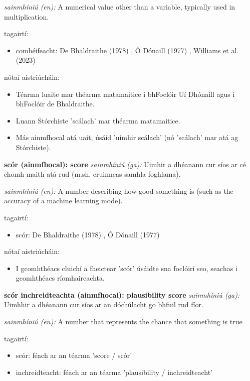 \documentclass{article}
\begin{document}
\textit{sainmhíniú (en):} A numerical value other than a variable, typically used in multiplication.

tagairtí:
\begin{itemize}
	\item comhéifeacht: De Bhaldraithe (1978) \cite{de-bhaldraithe}, Ó Dónaill (1977) \cite{odonaill}, Williams et al. (2023) \cite{storchiste}
\end{itemize}

nótaí aistriúcháin:
\begin{itemize}
	\item Téarma luaite mar théarma matamaitice i bhFoclóir Uí Dhónaill agus i bhFoclóir de Bhaldraithe.
	\item Luann Stórchiste 'scálach' mar théarma matamaitice.
	\item Más ainmfhocal atá uait, úsáid 'uimhir scálach' (nó 'scálach' mar atá ag Stórchiste).
\end{itemize}


\textbf{scór (ainmfhocal): score}
\textit{sainmhíniú (ga):} Uimhir a dhéanann cur síos ar cé chomh maith atá rud (m.sh. cruinneas samhla foghlama).

\textit{sainmhíniú (en):} A number describing how good something is (such as the accuracy of a machine learning mode).

tagairtí:
\begin{itemize}
	\item scór: De Bhaldraithe (1978) \cite{de-bhaldraithe}, Ó Dónaill (1977) \cite{odonaill}
\end{itemize}

nótaí aistriúcháin:
\begin{itemize}
	\item I gcomhthéacs cluichí a fheictear 'scór' úsáidte sna foclóirí seo, seachas i gcomhthéacs ríomhaireachta.
\end{itemize}


\textbf{scór inchreidteachta (ainmfhocal): plausibility score}
\textit{sainmhíniú (ga):} Uimhhir a dhéanann cur síos ar an dóchúlacht go bhfuil rud fíor.

\textit{sainmhíniú (en):} A number that represents the chance that something is true

tagairtí:
\begin{itemize}
	\item scór: féach ar an téarma 'score / scór'
	\item inchreidteacht: féach ar an téarma 'plausibility / inchreidteacht'
\end{itemize}
\end{document}
